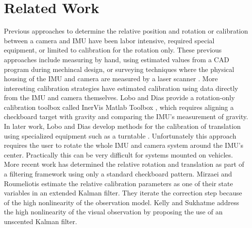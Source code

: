 \section{Related Work}
\label{sec:related_work}

Previous approaches to determine the relative position and rotation or calibration between a camera and IMU have been labor intensive, required special equipment, or limited to calibration for the rotation only. These previous approaches include measuring by hand, using estimated values from a CAD program during mechincal design, or surveying techniques where the physical housing of the IMU and camera are measured by a laser scanner \cite{Johnson_fieldtesting}.  More interesting calibration strategies have estimated calibration using data directly from the IMU and camera themselves. Lobo and Dias provide a rotation-only calibration toolbox called InerVis Matlab Toolbox \cite{Lobo:2009:Online}, which requires aligning a checkboard target with gravity and comparing the IMU's measurement of gravity. In later work, Lobo and Dias develop methods for the calibration of translation using specialized equipment such as a turntable  \cite{lobo2007relative}. Unfortunately this approach requires the user to rotate the whole IMU and camera system around the IMU's center. Practically this can be very difficult for systems mounted on vehicles. More recent work has determined the relative rotation and translation as part of a filtering framework using only a standard checkboard pattern.  Mirzaei and Roumeliotis \cite{mirzaei2008kalman} estimate the relative calibration parameters as one of their state variables in an extended Kalman filter. They iterate the correction step because of the high nonlinearity of the observation model. Kelly and Sukhatme \cite{2011:kelly:article} address the high nonlinearity of the visual observation by proposing the use of an unscented Kalman filter.